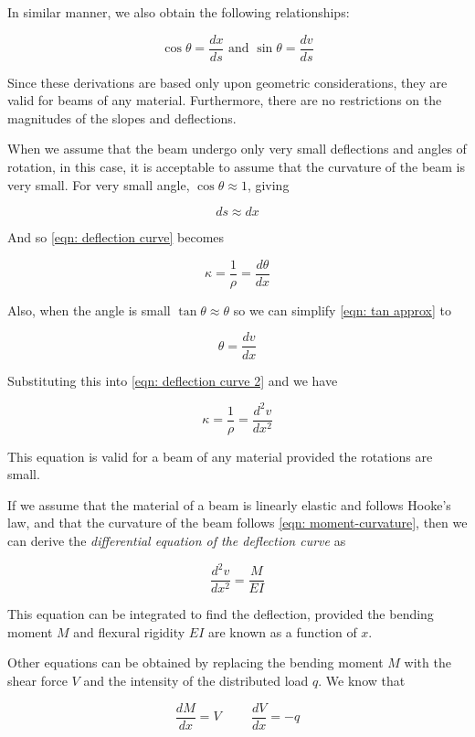 \documentclass[
10pt,
a4paper,
openany,
svgnames,
]{book}
\begin{document}
In similar manner, we also obtain the following relationships:

\[\cos \theta  = \frac{dx}{ds} \text{ and } \sin \theta  = \frac{dv}{ds}\]

Since these derivations are based only upon geometric considerations, they are valid for beams of any material. Furthermore, there are no restrictions on the magnitudes of the slopes and deflections.

When we assume that the beam undergo only very small deflections and angles of rotation, in this case, it is acceptable to assume that the curvature of the beam is very small. For very small angle, $\cos\theta \approx 1$, giving

\[ds \approx dx\]

And so \cref{eqn: deflection curve} becomes

\begin{equation} \label{eqn: deflection curve 2}
  \kappa  = \frac{1}{\rho } = \frac{d\theta }{dx}
\end{equation}

Also, when the angle is small $\tan\theta \approx \theta$ so we can simplify \cref{eqn: tan approx} to

\[\theta  = \frac{dv}{dx}\]

Substituting this into \cref{eqn: deflection curve 2} and we have

\[\kappa  = \frac{1}{\rho } = \frac{d^2v}{dx^2}\]

This equation is valid for a beam of any material provided the rotations are small.

If we assume that the material of a beam is linearly elastic and follows Hooke’s law, and that the curvature of the beam follows \cref{eqn: moment-curvature}, then we can derive the \emph{differential equation of the deflection curve} as

\begin{equation} \label{eqn: diff equation of deflection}
  \frac{d^2v}{dx^2} = \frac{M}{EI}
\end{equation}

This equation can be integrated to find the deflection, provided the bending moment $M$ and flexural rigidity $EI$ are known as a function of $x$.

Other equations can be obtained by replacing the bending moment $M$ with the shear force $V$ and the intensity of the distributed load $q$. We know that

\begin{equation} \label{eqn: shear force and load intensity}
  \frac{dM}{dx} = V \hspace{1cm} \frac{dV}{dx} =  - q
\end{equation}
\end{document}
